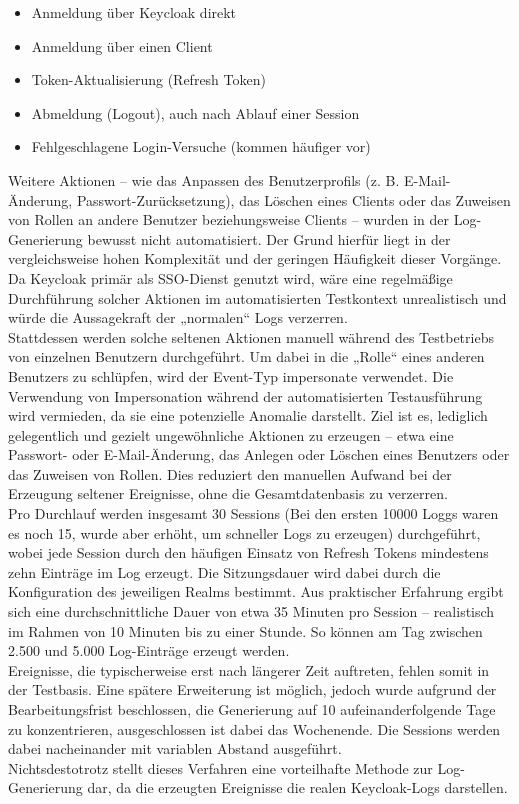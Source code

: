 \documentclass[a4paper,12pt]{article}
\begin{document}
	\begin{itemize}
		\item Anmeldung über Keycloak direkt
		\item Anmeldung über einen Client
		\item Token-Aktualisierung (Refresh Token)
		\item Abmeldung (Logout), auch nach Ablauf einer Session
		\item Fehlgeschlagene Login-Versuche (kommen häufiger vor)
	\end{itemize}
	Weitere Aktionen – wie das Anpassen des Benutzerprofils (z. B. E-Mail-Änderung, Passwort-Zurücksetzung), das Löschen eines Clients oder das Zuweisen von Rollen an andere Benutzer beziehungsweise Clients – wurden in der Log-Generierung bewusst nicht automatisiert. Der Grund hierfür liegt in der vergleichsweise hohen Komplexität und der geringen Häufigkeit dieser Vorgänge. Da Keycloak primär als SSO-Dienst genutzt wird, wäre eine regelmäßige Durchführung solcher Aktionen im automatisierten Testkontext unrealistisch und würde die Aussagekraft der „normalen“ Logs verzerren.
	\\[0.5em]
	Stattdessen werden solche seltenen Aktionen manuell während des Testbetriebs von einzelnen Benutzern durchgeführt. Um dabei in die „Rolle“ eines anderen Benutzers zu schlüpfen, wird der Event-Typ \gls{impersonate} verwendet. Die Verwendung von Impersonation während der automatisierten Testausführung wird vermieden, da sie eine potenzielle Anomalie darstellt. Ziel ist es, lediglich gelegentlich und gezielt ungewöhnliche Aktionen zu erzeugen – etwa eine Passwort- oder E-Mail-Änderung, das Anlegen oder Löschen eines Benutzers oder das Zuweisen von Rollen. Dies reduziert den manuellen Aufwand bei der Erzeugung seltener Ereignisse, ohne die Gesamtdatenbasis zu verzerren.
	\\[0.5em]
	Pro Durchlauf werden insgesamt 30 Sessions (Bei den ersten 10000 Loggs waren es noch 15, wurde aber erhöht, um schneller Logs zu erzeugen) durchgeführt, wobei jede Session durch den häufigen Einsatz von Refresh Tokens mindestens zehn Einträge im Log erzeugt. Die Sitzungsdauer wird dabei durch die Konfiguration des jeweiligen Realms bestimmt. Aus praktischer Erfahrung ergibt sich eine durchschnittliche Dauer von etwa 35 Minuten pro Session – realistisch im Rahmen von 10 Minuten bis zu einer Stunde. So können am Tag zwischen 2.500 und 5.000 Log-Einträge erzeugt werden.
	\\[0.5em]
	Ereignisse, die typischerweise erst nach längerer Zeit auftreten, fehlen somit in der Testbasis. Eine spätere Erweiterung ist möglich, jedoch wurde aufgrund der Bearbeitungsfrist beschlossen, die Generierung auf 10 aufeinanderfolgende Tage zu konzentrieren, ausgeschlossen ist dabei das Wochenende. Die Sessions werden dabei nacheinander mit variablen Abstand ausgeführt.
	\\[0.5em]
	Nichtsdestotrotz stellt dieses Verfahren eine vorteilhafte Methode zur Log-Generierung dar, da die erzeugten Ereignisse die realen Keycloak-Logs darstellen.
	
\end{document}
